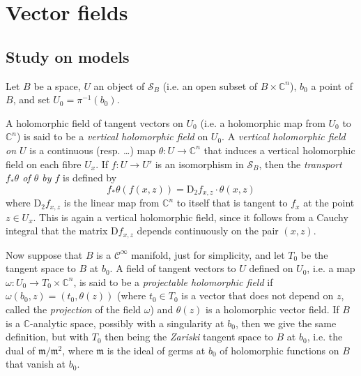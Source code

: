 \documentclass{article}
\newcommand{\CC}{\mathbb{C}}
\newcommand{\DD}{\mathrm{D}}
\newcommand{\oldpage}[1]{\marginpar{\footnotesize$\Big\vert$ \textit{p.~#1}}}
\begin{document}
\section{Vector fields}
\label{III}

\subsection{Study on models}
\label{III.1}

Let $B$ be a space, $U$ an object of $\mathscr{S}_B$ (i.e. an open subset of $B\times\CC^n$), $b_0$ a point of $B$, and set $U_0=\pi^{-1}(b_0)$.

A holomorphic field of tangent vectors on $U_0$ (i.e. a holomorphic map from $U_0$ to $\CC^n$) is said to be a \emph{vertical holomorphic field} on $U_0$.
A \emph{vertical holomorphic field on $U$} is a continuous (resp. \ldots) map $\theta\colon U\to\CC^n$ that induces a vertical holomorphic field on each fibre $U_x$.
If $f\colon U\to U'$ is an isomorphism in $\mathscr{S}_B$, then the \emph{transport $f_*\theta$ of $\theta$ by $f$} is defined by
\[
  f_*\theta(f(x,z)) = \DD_2 f_{x,z}\cdot\theta(x,z)
\]
where $\DD_2 f_{x,z}$ is the linear map from $\CC^n$ to itself that is tangent to $f_x$ at the point $z\in U_x$.
This is again a vertical holomorphic field, since it follows from a Cauchy integral that the matrix $\DD f_{x,z}$ depends continuously on the pair $(x,z)$.

Now suppose that $B$ is a $\mathscr{C}^\infty$ manifold, just for simplicity, and let $T_0$ be the tangent space to $B$ at $b_0$.
A field of tangent vectors to $U$ defined on $U_0$,
\oldpage{2-05}
i.e. a map $\omega\colon U_0\to T_0\times\CC^n$, is said to be a \emph{projectable holomorphic field} if $\omega(b_0,z)=(t_0,\theta(z))$ (where $t_0\in T_0$ is a vector that does not depend on $z$, called the \emph{projection} of the field $\omega$) and $\theta(z)$ is a holomorphic vector field.
If $B$ is a $\CC$-analytic space, possibly with a singularity at $b_0$, then we give the same definition, but with $T_0$ then being the \emph{Zariski} tangent space to $B$ at $b_0$, i.e. the dual of $\mathfrak{m}/\mathfrak{m}^2$, where $\mathfrak{m}$ is the ideal of germs at $b_0$ of holomorphic functions on $B$ that vanish at $b_0$.
\end{document}
